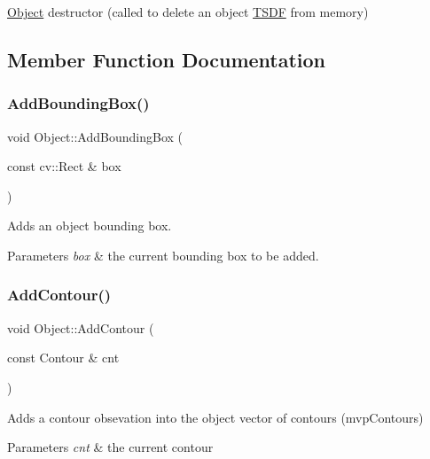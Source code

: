 \hyperlink{classObject}{Object} destructor (called to delete an object \hyperlink{classTSDF}{T\+S\+DF} from memory) 

\subsection{Member Function Documentation}
\mbox{\label{classObject_a93f6229c59ae6f435b0a31ee285740ae}} 
\subsubsection{\texorpdfstring{Add\+Bounding\+Box()}{AddBoundingBox()}}
{\footnotesize\ttfamily void Object\+::\+Add\+Bounding\+Box (\begin{DoxyParamCaption}\item[{const cv\+::\+Rect \&}]{box }\end{DoxyParamCaption})}

Adds an object bounding box. 
\begin{DoxyParams}{Parameters}
{\em box} & the current bounding box to be added. \\
\hline
\end{DoxyParams}
\mbox{\label{classObject_ad585053a0c8b020a262c75fbd8c9d428}} 
\subsubsection{\texorpdfstring{Add\+Contour()}{AddContour()}}
{\footnotesize\ttfamily void Object\+::\+Add\+Contour (\begin{DoxyParamCaption}\item[{const Contour \&}]{cnt }\end{DoxyParamCaption})}

Adds a contour obsevation into the object vector of contours (mvp\+Contours) 
\begin{DoxyParams}{Parameters}
{\em cnt} & the current contour \\
\hline
\end{DoxyParams}
\mbox{\label{classObject_a6661c15e096fc5ec5b6eba0eda114ac8}} 
